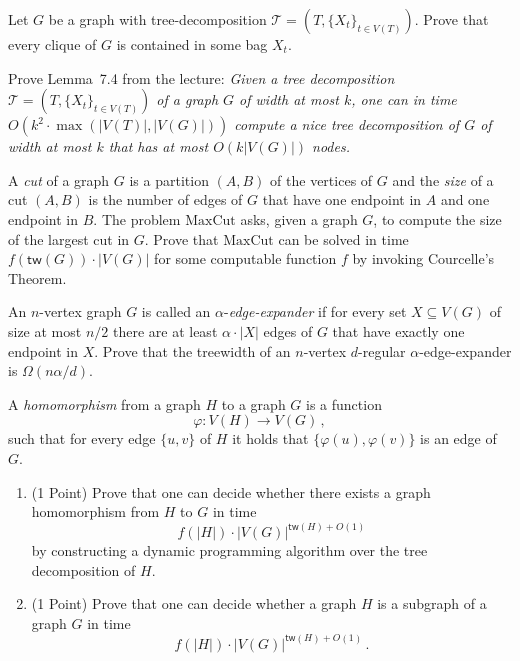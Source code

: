\begin{exercise}[\easy]
Let $G$ be a graph with tree-decomposition $\mathcal{T}=(T,\{X_t\}_{t\in V(T)})$. Prove that every clique of $G$ is contained in some bag $X_t$.
\end{exercise}

\begin{exercise}[\easy]
Prove Lemma~7.4 from the lecture:\newline
\noindent \textit{Given a tree decomposition $\mathcal{T}=(T,\{X_t\}_{t\in V(T)})$ of a graph $G$ of width at most $k$, one can in time $O(k^2\cdot \max(|V(T)|,|V(G)|))$ compute a nice tree decomposition of $G$ of width at most $k$ that has at most $O(k|V(G)|)$ nodes.
}
\end{exercise}

\begin{exercise}
A \emph{cut} of a graph $G$ is a partition $(A,B)$ of the vertices of $G$ and the \emph{size} of a cut $(A,B)$ is the number of edges of $G$ that have one endpoint in $A$ and one endpoint in $B$. The problem $\mathrm{MaxCut}$ asks, given a graph $G$, to compute the size of the largest cut in $G$. Prove that $\mathrm{MaxCut}$ can be solved in time $f(\mathsf{tw}(G)) \cdot |V(G)|$ for some computable function $f$ by invoking Courcelle's Theorem.
\end{exercise}


\begin{exercise}
An $n$-vertex graph $G$ is called an $\alpha$-\emph{edge-expander} if for every set $X \subseteq V(G)$ of size at most $n/2$ there are at least $\alpha\cdot |X|$ edges of $G$ that have exactly one endpoint in $X$. Prove that the treewidth of an $n$-vertex $d$-regular $\alpha$-edge-expander is $\Omega(n\alpha/d)$.
\end{exercise}


\begin{exercise}
A \emph{homomorphism} from a graph $H$ to a graph $G$ is a function \[\varphi:V(H)\rightarrow V(G) \,, \] such that for every edge $\{u,v\}$ of $H$ it holds that $\{\varphi(u),\varphi(v)\}$ is an edge of $G$. 
\begin{enumerate}
\item (1 Point) Prove that one can decide whether there exists a graph homomorphism from $H$ to $G$ in time
\[f(|H|)\cdot |V(G)|^{\mathsf{tw}(H)+O(1)} \]
by constructing a dynamic programming algorithm over the tree decomposition of $H$.
\item (1 Point) Prove that one can decide whether a graph $H$ is a subgraph of a graph $G$ in time
\[f(|H|)\cdot |V(G)|^{\mathsf{tw}(H)+O(1)} \,.\]
\end{enumerate}
\end{exercise}
